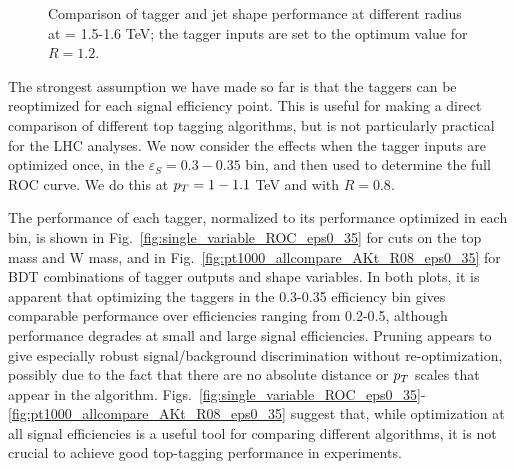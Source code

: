 \begin{figure}
\begin{center}
\caption{Comparison of tagger and jet shape performance at different radius at \pt = 1.5-1.6 TeV; the tagger inputs are set to the optimum value for $R=1.2$.}
\label{fig:Rcomparison_top_optOnce}
\end{center}
\end{figure}

 The strongest assumption we have made so far is that the taggers can be reoptimized for each signal efficiency point. This is useful for making a direct comparison of different top tagging algorithms, but is not particularly practical for the LHC analyses. We now consider the effects when the tagger inputs are optimized once, in the $\varepsilon_S=0.3-0.35$ bin, and then used to determine the full ROC curve. We do this at $p_T=1-1.1$ TeV and with $R=0.8$.

The performance of each tagger, normalized to its performance optimized in each bin, is shown in Fig.~\ref{fig:single_variable_ROC_eps0_35} for cuts on the top mass and W mass, and in Fig.~\ref{fig:pt1000_allcompare_AKt_R08_eps0_35} for BDT combinations of tagger outputs and shape variables. In both plots, it is apparent that optimizing the taggers in the 0.3-0.35 efficiency bin gives comparable performance over efficiencies ranging from 0.2-0.5, although performance degrades at small and large signal efficiencies. Pruning appears to give especially robust signal/background discrimination without re-optimization, possibly due to the fact that there are no absolute distance or $p_T$ scales that appear in the algorithm. Figs.~\ref{fig:single_variable_ROC_eps0_35}-\ref{fig:pt1000_allcompare_AKt_R08_eps0_35} suggest that, while optimization at all signal efficiencies is a useful tool for comparing different algorithms, it is not crucial to achieve good top-tagging performance in experiments.

